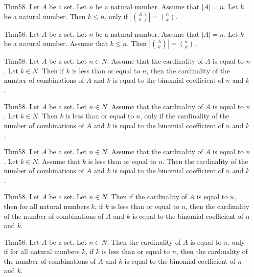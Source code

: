 \documentclass{article}
\begin{document}
Thm58. Let $A$ be a set. Let $n$ be a natural number. Assume that $| A | = n$. Let $k$ be a natural number. Then $k \leq n$, only if $| \binom{ A }{ k}| = \binom{ n }{ k}$.

Thm58. Let $A$ be a set. Let $n$ be a natural number. Assume that $| A | = n$. Let $k$ be a natural number. Assume that $k \leq n$. Then $| \binom{ A }{ k}| = \binom{ n }{ k}$.

Thm58. Let $A$ be a set. Let $n \in N$. Assume that the cardinality of $A$ is equal to $n$. Let $k \in N$. Then if $k$ is less than or equal to $n$, then the cardinality of the number of combinations of $A$ and $k$ is equal to the binomial coefficient of $n$ and $k$.

Thm58. Let $A$ be a set. Let $n \in N$. Assume that the cardinality of $A$ is equal to $n$. Let $k \in N$. Then $k$ is less than or equal to $n$, only if the cardinality of the number of combinations of $A$ and $k$ is equal to the binomial coefficient of $n$ and $k$.

Thm58. Let $A$ be a set. Let $n \in N$. Assume that the cardinality of $A$ is equal to $n$. Let $k \in N$. Assume that $k$ is less than or equal to $n$. Then the cardinality of the number of combinations of $A$ and $k$ is equal to the binomial coefficient of $n$ and $k$.

Thm58. Let $A$ be a set. Let $n \in N$. Then if the cardinality of $A$ is equal to $n$, then for all natural numbers $k$, if $k$ is less than or equal to $n$, then the cardinality of the number of combinations of $A$ and $k$ is equal to the binomial coefficient of $n$ and $k$.

Thm58. Let $A$ be a set. Let $n \in N$. Then the cardinality of $A$ is equal to $n$, only if for all natural numbers $k$, if $k$ is less than or equal to $n$, then the cardinality of the number of combinations of $A$ and $k$ is equal to the binomial coefficient of $n$ and $k$.
\end{document}

